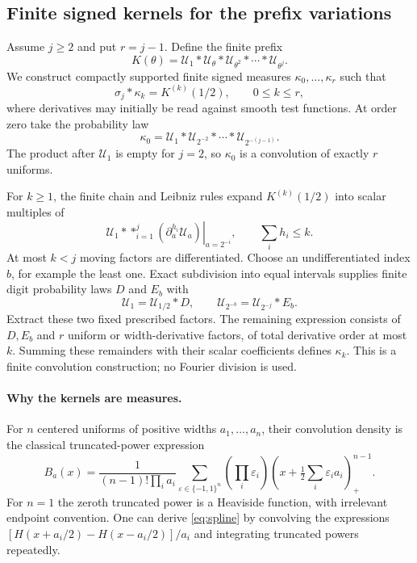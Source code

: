 \documentclass[11pt,letterpaper]{article}
\theoremstyle{remark}\newtheorem{remark}[theorem]{Remark}
\newcommand{\Un}{\mathcal U}\newcommand{\Law}{\mathcal L}
\begin{document}
\subsection{Finite signed kernels for the prefix variations}
Assume $j\ge2$ and put $r=j-1$. Define the finite prefix
\[
K(\theta)=\Un_1*\Un_\theta*\Un_{\theta^2}*\cdots*\Un_{\theta^j}.
\]
We construct compactly supported finite signed measures $\kappa_0,\ldots,\kappa_r$ such that
\begin{equation}\label{eq:kernel-identities}
\sigma_j*\kappa_k=K^{(k)}(1/2),\qquad0\le k\le r,
\end{equation}
where derivatives may initially be read against smooth test functions. At order zero take the probability law
\[
\kappa_0=\Un_1*\Un_{2^{-2}}*\cdots*\Un_{2^{-(j-1)}}.
\]
The product after $\Un_1$ is empty for $j=2$, so $\kappa_0$ is a convolution of exactly $r$ uniforms.

For $k\ge1$, the finite chain and Leibniz rules expand $K^{(k)}(1/2)$ into scalar multiples of
\[
\Un_1*\mathop{*}_{i=1}^j
 \left.(\partial_a^{h_i}\Un_a)\right|_{a=2^{-i}},
\qquad \sum_i h_i\le k.
\]
At most $k<j$ moving factors are differentiated. Choose an undifferentiated index $b$, for example the least one. Exact subdivision into equal intervals supplies finite digit probability laws $D$ and $E_b$ with
\[
\Un_1=\Un_{1/2}*D,\qquad
\Un_{2^{-b}}=\Un_{2^{-j}}*E_b.
\]
Extract these two fixed prescribed factors. The remaining expression consists of $D,E_b$ and $r$ uniform or width-derivative factors, of total derivative order at most $k$. Summing these remainders with their scalar coefficients defines $\kappa_k$. This is a finite convolution construction; no Fourier division is used.

\paragraph{Why the kernels are measures.}
For $n$ centered uniforms of positive widths $a_1,\ldots,a_n$, their convolution density is the classical truncated-power expression \cite{BradleyGupta}
\begin{equation}\label{eq:spline}
B_a(x)=\frac1{(n-1)!\prod_i a_i}
 \sum_{\varepsilon\in\{-1,1\}^n}\left(\prod_i\varepsilon_i\right)
 \left(x+\tfrac12\sum_i\varepsilon_i a_i\right)_+^{n-1}.
\end{equation}
For $n=1$ the zeroth truncated power is a Heaviside function, with irrelevant endpoint convention. One can derive \eqref{eq:spline} by convolving the expressions
$[H(x+a_i/2)-H(x-a_i/2)]/a_i$ and integrating truncated powers repeatedly.
\end{document}
